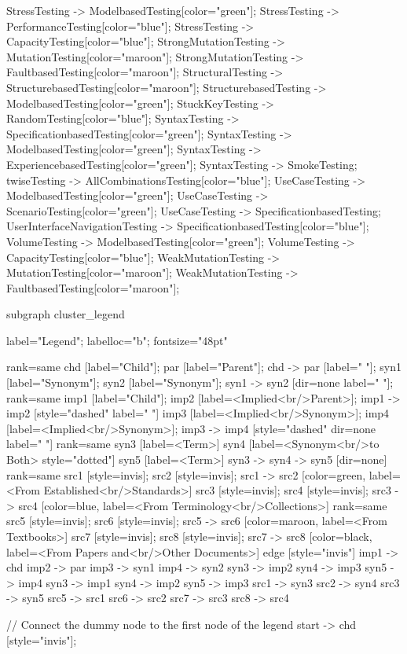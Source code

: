 \documentclass{article}
\begin{document}
{StressTesting -> ModelbasedTesting[color="green"];
StressTesting -> PerformanceTesting[color="blue"];
StressTesting -> CapacityTesting[color="blue"];
StrongMutationTesting -> MutationTesting[color="maroon"];
StrongMutationTesting -> FaultbasedTesting[color="maroon"];
StructuralTesting -> StructurebasedTesting[color="maroon"];
StructurebasedTesting -> ModelbasedTesting[color="green"];
StuckKeyTesting -> RandomTesting[color="blue"];
SyntaxTesting -> SpecificationbasedTesting[color="green"];
SyntaxTesting -> ModelbasedTesting[color="green"];
SyntaxTesting -> ExperiencebasedTesting[color="green"];
SyntaxTesting -> SmokeTesting;
twiseTesting -> AllCombinationsTesting[color="blue"];
UseCaseTesting -> ModelbasedTesting[color="green"];
UseCaseTesting -> ScenarioTesting[color="green"];
UseCaseTesting -> SpecificationbasedTesting;
UserInterfaceNavigationTesting -> SpecificationbasedTesting[color="blue"];
VolumeTesting -> ModelbasedTesting[color="green"];
VolumeTesting -> CapacityTesting[color="blue"];
WeakMutationTesting -> MutationTesting[color="maroon"];
WeakMutationTesting -> FaultbasedTesting[color="maroon"];

subgraph cluster_legend {

    label="Legend";
    labelloc="b";
    fontsize="48pt"

    {
        rank=same
        chd [label="Child"];
        par [label="Parent"];
        chd -> par [label="                "];
        syn1 [label="Synonym"];
        syn2 [label="Synonym"];
        syn1 -> syn2 [dir=none label="                "];
    }
    {
        rank=same
        imp1 [label="Child"];
        imp2 [label=<Implied<br/>Parent>];
        imp1 -> imp2 [style="dashed" label="                "]
        imp3 [label=<Implied<br/>Synonym>];
        imp4 [label=<Implied<br/>Synonym>];
        imp3 -> imp4 [style="dashed" dir=none label="                "]
    }
    {
        rank=same
        syn3 [label=<Term>]
        syn4 [label=<Synonym<br/>to Both> style="dotted"]
        syn5 [label=<Term>]
        syn3 -> syn4 -> syn5 [dir=none]
    }
{
rank=same
src1 [style=invis];
src2 [style=invis];
src1 -> src2 [color=green, label=<From Established<br/>Standards>]
src3 [style=invis];
src4 [style=invis];
src3 -> src4 [color=blue, label=<From Terminology<br/>Collections>]
}
{
rank=same
src5 [style=invis];
src6 [style=invis];
src5 -> src6 [color=maroon, label=<From Textbooks>]
src7 [style=invis];
src8 [style=invis];
src7 -> src8 [color=black, label=<From Papers and<br/>Other Documents>]
}
edge [style="invis"]
imp1 -> chd
imp2 -> par
imp3 -> syn1
imp4 -> syn2
syn3 -> imp2
syn4 -> imp3
syn5 -> imp4
syn3 -> imp1
syn4 -> imp2
syn5 -> imp3
src1 -> syn3
src2 -> syn4
src3 -> syn5
src5 -> src1
src6 -> src2
src7 -> src3
src8 -> src4
}

// Connect the dummy node to the first node of the legend
start -> chd [style="invis"];
}
\end{document}
